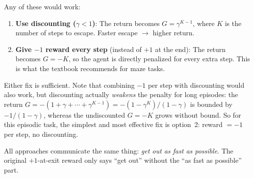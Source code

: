 \documentclass[11pt]{article}
\begin{document}
Any of these would work:

\begin{enumerate}
    \item \textbf{Use discounting ($\gamma < 1$)}: The return becomes
          $G = \gamma^{K-1}$, where $K$ is the number of steps to escape.
          Faster escape $\to$ higher return.
    \item \textbf{Give $-1$ reward every step} (instead of $+1$ at the end):
          The return becomes $G = -K$, so the agent is directly penalized for
          every extra step. This is what the textbook recommends for maze tasks.
\end{enumerate}

Either fix is sufficient. Note that combining $-1$ per step with discounting
would also work, but discounting actually \emph{weakens} the penalty for long
episodes: the return $G = -(1 + \gamma + \cdots + \gamma^{K-1}) = -(1-\gamma^K)/(1-\gamma)$
is bounded by $-1/(1-\gamma)$, whereas the undiscounted $G = -K$ grows without bound.
So for this episodic task, the simplest and most effective fix is option~2: reward
$= -1$ per step, no discounting.

All approaches communicate the same thing: \emph{get out as fast as possible}.
The original $+1$-at-exit reward only says ``get out'' without the
``as fast as possible'' part.
\end{document}

